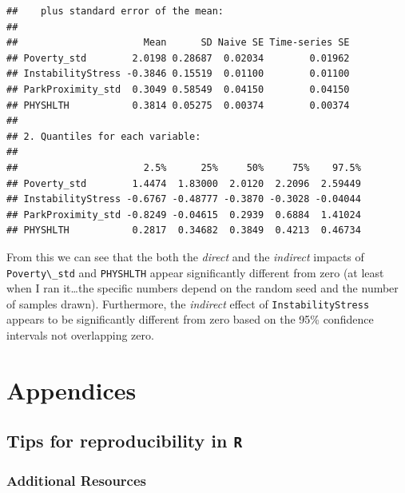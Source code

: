 \documentclass[
]{book}
\newcommand{\passthrough}[1]{#1}
\begin{document}
\begin{lstlisting}
##    plus standard error of the mean:
## 
##                      Mean      SD Naive SE Time-series SE
## Poverty_std        2.0198 0.28687  0.02034        0.01962
## InstabilityStress -0.3846 0.15519  0.01100        0.01100
## ParkProximity_std  0.3049 0.58549  0.04150        0.04150
## PHYSHLTH           0.3814 0.05275  0.00374        0.00374
## 
## 2. Quantiles for each variable:
## 
##                      2.5%      25%     50%     75%    97.5%
## Poverty_std        1.4474  1.83000  2.0120  2.2096  2.59449
## InstabilityStress -0.6767 -0.48777 -0.3870 -0.3028 -0.04044
## ParkProximity_std -0.8249 -0.04615  0.2939  0.6884  1.41024
## PHYSHLTH           0.2817  0.34682  0.3849  0.4213  0.46734
\end{lstlisting}

From this we can see that the both the \emph{direct} and the \emph{indirect} impacts of \passthrough{\lstinline!Poverty\_std!} and \passthrough{\lstinline!PHYSHLTH!} appear significantly different from zero (at least when I ran it\ldots the specific numbers depend on the random seed and the number of samples drawn). Furthermore, the \emph{indirect} effect of \passthrough{\lstinline!InstabilityStress!} appears to be significantly different from zero based on the 95\% confidence intervals not overlapping zero.

\hypertarget{part-appendices}{%
\part{Appendices}\label{part-appendices}}

\hypertarget{tips-for-reproducibility-in-r}{%
\chapter{\texorpdfstring{Tips for reproducibility in \texttt{R}}{Tips for reproducibility in R}}\label{tips-for-reproducibility-in-r}}

\hypertarget{additional-resources}{%
\section*{Additional Resources}\label{additional-resources}}
\end{document}
